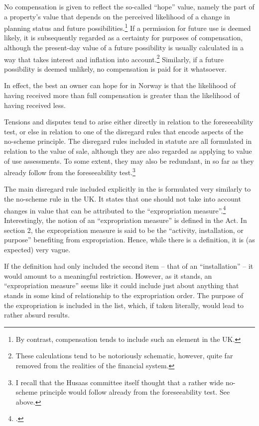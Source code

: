 No compensation is given to reflect the so-called ``hope'' value, namely the part of a property's value that depends on the perceived likelihood of a change in planning status and future possibilities.\footnote{By contrast, compensation tends to include such an element in the UK.} If a permission for future use is deemed likely, it is subsequently regarded as a certainty for purposes of compensation, although the present-day value of a future possibility is usually calculated in a way that takes interest and inflation into account.\footnote{These calculations tend to be notoriously schematic, however, quite far removed from the realities of the financial system.} Similarly, if a future possibility is deemed unlikely, no compensation is paid for it whatsoever.

In effect, the best an owner can hope for in Norway is that the likelihood of having received more than full compensation is greater than the likelihood of having received less.

Tensions and disputes tend to arise either directly in relation to the foreseeability test, or else in relation to one of the disregard rules that encode aspects of the no-scheme principle. The disregard rules included in statute are all formulated in relation to the value of sale, although they are also regarded as applying to value of use assessments. To some extent, they may also be redundant, in so far as they already follow from the foreseeability test.\footnote{I recall that the Husaas committee itself thought that a rather wide no-scheme principle would follow already from the foreseeability test. See above.}

The main disregard rule included explicitly in the \cite{ca84} is formulated very similarly to the no-scheme rule in the UK. It states that one should not take into account changes in value that can be attributed to the ``expropriation measure''.\footcite[5]{ca84} Interestingly, the notion of an ``expropriation measure'' is defined in the Act. In section 2, the expropriation measure is said to be the ``activity, installation, or purpose'' benefiting from expropriation. Hence, while there is a definition, it is (as expected) very vague. 

If the definition had only included the second item -- that of an ``installation'' -- it would amount to a meaningful restriction. However, as it stands, an ``expropriation measure'' seems like it could include just about anything that stands in some kind of relationship to the expropriation order.
The purpose of the expropriation is included in the list, which, if taken literally, would lead to rather absurd results. 

